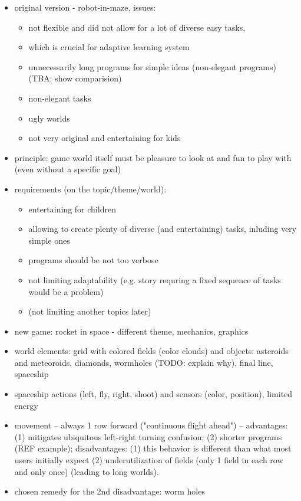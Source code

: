 \begin{itemize}
\item original version - robot-in-maze, issues:
  \begin{itemize}
  \item not flexible and did not allow for a lot of diverse easy tasks,
  \item which is crucial for adaptive learning system
  \item unnecessarily long programs for simple ideas (non-elegant programs) (TBA: show comparision)
  \item non-elegant tasks
  \item ugly worlds
  \item not very original and entertaining for kids
  \end{itemize}
\item principle: game world itself must be pleasure to look at and fun to play
with (even without a specific goal) \cite{book-of-lenses}
\item requirements (on the topic/theme/world):
  \begin{itemize}
  \item entertaining for children
  \item allowing to create plenty of diverse (and entertaining) tasks, inluding very simple ones
  \item programs should be not too verbose
  \item not limiting adaptability (e.g. story requring a fixed sequence of tasks would be a problem)
  \item (not limiting another topics later)
  \end{itemize}
\item new game: rocket in space - different theme, mechanics, graphics
\item world elements: grid with colored fields (color clouds) and objects: asteroids and meteoroids, diamonds, wormholes (TODO: explain why), final line, spaceship
\item spaceship actions (left, fly, right, shoot) and sensors (color, position), limited energy
\item movement -- always 1 row forward ("continuous flight ahead") --
  advantages:
  (1) mitigates ubiquitous left-right turning confusion;
  (2) shorter programs (REF example);
  disadvantages:
  (1) this behavior is different than what most users initially expect
  (2) underutilization of fields (only 1 field in each row and only once)
      (leading to long worlds).
\item chosen remedy for the 2nd disadvantage: worm holes

\end{itemize}
